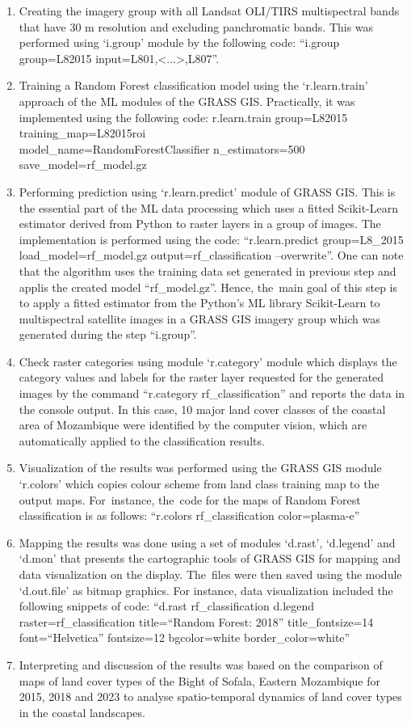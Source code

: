 \documentclass[coasts,article,accept,pdftex,oneauthor]{Definitions/mdpi}
\begin{document}
\begin{enumerate}
  \item Creating the imagery group with all Landsat OLI/TIRS {multispectral }bands {that have 30 m resolution and excluding panchromatic bands. This was performed }using `i.group' module {by the following code: ``i.group group=L82015 input=L801,<...>,L807''}. 
  \item {Training} a Random Forest classification model using {the }`r.learn.train' approach of {the }ML modules of {the }GRASS GIS. {Practically, it was implemented using the following code: r.learn.train group=L82015 training\_map=L82015roi \\
  model\_name=RandomForestClassifier n\_estimators=500 save\_model=rf\_model.gz}
  \item Performing prediction using `r.learn.predict' module of GRASS GIS{. This is the essential part of the ML data processing }which uses a fitted Scikit-Learn estimator {derived} from Python to raster layers in a group of images. {The implementation is performed using the code: ``r.learn.predict group=L8\_2015 load\_model=rf\_model.gz output=rf\_classification --overwrite''. One can note that the algorithm uses the training data set generated in previous step and applis the created model ``rf\_model.gz''. Hence, the~main goal of this step is to apply a fitted estimator from the Python's ML library Scikit-Learn to multispectral satellite images in a GRASS GIS imagery group which was generated during the step ``i.group''.} 
  \item Check raster categories using module `r.category' {module which displays the category values and labels for the raster layer requested for the generated images by the command ``r.category rf\_classification'' and reports the data in the console output. In} this case, 10 major land cover classes of the coastal area of Mozambique were identified by the computer vision, which are automatically applied to the classification results.
  \item Visualization of the results {was performed }using {the GRASS GIS }module `r.colors' which copies colour scheme from land class training map to the output maps{. For~instance, the~code for the maps of Random Forest classification is as follows: ``r.colors rf\_classification color=plasma-e''}
  \item Mapping the results {was done }using a set of modules `d.rast', `d.legend' and `d.mon' {that presents the cartographic tools of GRASS GIS for mapping and data visualization on the display}. The~files were {then }saved using the module `d.out.file' as bitmap graphics. {For instance, data visualization included the following snippets of code: ``d.rast rf\_classification d.legend raster=rf\_classification title=``Random Forest: 2018'' title\_fontsize=14 font=``Helvetica'' fontsize=12 bgcolor=white border\_color=white''}
  \item Interpreting and discussion of the results {was based on the} comparison of maps of land cover types of the Bight of Sofala, Eastern Mozambique for 2015, 2018 and 2023 {to analyse spatio-temporal dynamics of land cover types in the coastal landscapes}. 
\end{enumerate}  
\end{document}
